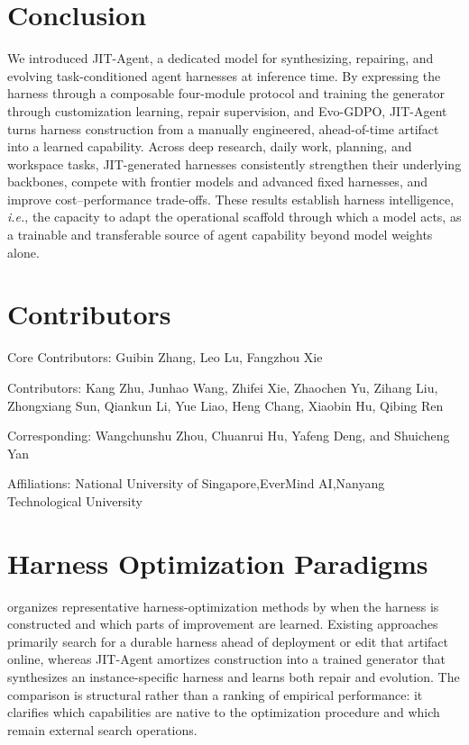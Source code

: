 \documentclass{article}
\newcommand{\ourmethod}{JIT-Agent\xspace}
\begin{document}
\vspace{-0.5em}
\section{Conclusion}
\vspace{-0.5em}
We introduced \ourmethod, a dedicated model for synthesizing, repairing, and evolving task-conditioned agent harnesses at inference time. By expressing the harness through a composable four-module protocol and training the generator through customization learning, repair supervision, and Evo-GDPO, \ourmethod turns harness construction from a manually engineered, ahead-of-time artifact into a learned capability. Across deep research, daily work, planning, and workspace tasks, JIT-generated harnesses consistently strengthen their underlying backbones, compete with frontier models and advanced fixed harnesses, and improve cost--performance trade-offs. These results establish harness intelligence, \textit{i.e.}, the capacity to adapt the operational scaffold through which a model acts, as a trainable and transferable source of agent capability beyond model weights alone.


\vspace{-0.5em}
\section*{Contributors}
\vspace{-0.5em}
Core Contributors: Guibin Zhang, Leo Lu, Fangzhou Xie

Contributors: Kang Zhu, Junhao Wang, Zhifei Xie, Zhaochen Yu, Zihang Liu, Zhongxiang Sun, Qiankun Li, Yue Liao, Heng Chang, Xiaobin Hu, Qibing Ren

Corresponding: Wangchunshu Zhou, Chuanrui Hu, Yafeng Deng, and Shuicheng Yan

Affiliations: National University of Singapore,\;EverMind AI,\;Nanyang Technological University







\clearpage
\appendix
\vspace{-0.5em}
\section{Harness Optimization Paradigms}
\vspace{-0.5em}
\label{sec:harness_optimization_appendix}
 organizes representative harness-optimization methods by when the harness is constructed and which parts of improvement are learned. Existing approaches primarily search for a durable harness ahead of deployment or edit that artifact online, whereas \ourmethod amortizes construction into a trained generator that synthesizes an instance-specific harness and learns both repair and evolution. The comparison is structural rather than a ranking of empirical performance: it clarifies which capabilities are native to the optimization procedure and which remain external search operations.
\end{document}
